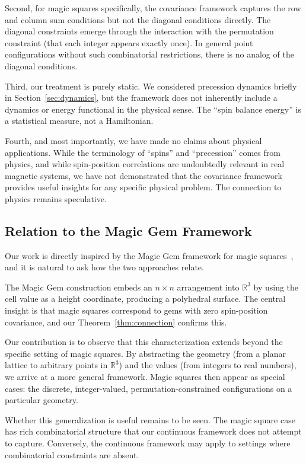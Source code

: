 Second, for magic squares specifically, the covariance framework captures the row and column sum conditions but not the diagonal conditions directly. The diagonal constraints emerge through the interaction with the permutation constraint (that each integer appears exactly once). In general point configurations without such combinatorial restrictions, there is no analog of the diagonal conditions.

Third, our treatment is purely static. We considered precession dynamics briefly in Section~\ref{sec:dynamics}, but the framework does not inherently include a dynamics or energy functional in the physical sense. The ``spin balance energy'' is a statistical measure, not a Hamiltonian.

Fourth, and most importantly, we have made no claims about physical applications. While the terminology of ``spins'' and ``precession'' comes from physics, and while spin-position correlations are undoubtedly relevant in real magnetic systems, we have not demonstrated that the covariance framework provides useful insights for any specific physical problem. The connection to physics remains speculative.

\subsection{Relation to the Magic Gem Framework}

Our work is directly inspired by the Magic Gem framework for magic squares~\cite{magic_gems_2025}, and it is natural to ask how the two approaches relate.

The Magic Gem construction embeds an $n \times n$ arrangement into $\mathbb{R}^3$ by using the cell value as a height coordinate, producing a polyhedral surface. The central insight is that magic squares correspond to gems with zero spin-position covariance, and our Theorem~\ref{thm:connection} confirms this.

Our contribution is to observe that this characterization extends beyond the specific setting of magic squares. By abstracting the geometry (from a planar lattice to arbitrary points in $\mathbb{R}^3$) and the values (from integers to real numbers), we arrive at a more general framework. Magic squares then appear as special cases: the discrete, integer-valued, permutation-constrained configurations on a particular geometry.

Whether this generalization is useful remains to be seen. The magic square case has rich combinatorial structure that our continuous framework does not attempt to capture. Conversely, the continuous framework may apply to settings where combinatorial constraints are absent.

